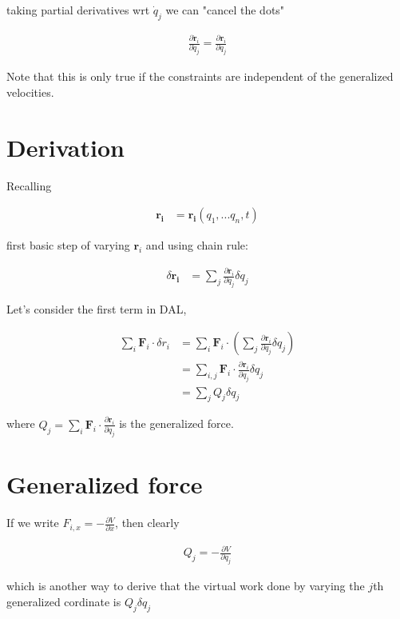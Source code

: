 \documentclass{article}
\newcommand{\mb}{\mathbf}
\begin{document}
taking partial derivatives wrt $\dot{q}_j$ we can "cancel the dots"

\begin{align}
\frac{\partial \dot{\mb{r}}_i}{\partial \dot{q}_j} = \frac{\partial \mb{r}_i}{\partial q_j}
\end{align}

Note that this is only true if the constraints are independent of the generalized velocities.

\section{Derivation}

Recalling

\begin{align}
\mb{r_i} &= \mb{r_i}(q_1,...q_n, t)
\end{align}

first basic step of varying $\mb{r}_i$ and using chain rule:

\begin{align}
\delta\mb{r_i} &= \sum_j \frac{\partial \mb{r}_i}{\partial q_j} \delta q_j
\end{align}

Let's consider the first term in DAL,

\begin{align}
\sum_i\mb{F}_i \cdot \delta{r}_i &= \sum_i\mb{F}_i \cdot(\sum_j\frac{\partial\mb{r}_i}{\partial q_j}\delta q_j) \\
&= \sum_{i,j}\mb{F}_i \cdot \frac{\partial \mb{r}_i}{\partial q_j} \delta q_j \\
&= \sum_j Q_j \delta q_j
\end{align}

where $Q_j = \sum_i \mb{F}_i \cdot \frac{\partial \mb{r}_i}{\partial q_j}$ is the generalized force.

\section{Generalized force}

If we write $F_{i,x} = -\frac{\partial V}{\partial x}$, then clearly 

\begin{align}
Q_j = -\frac{\partial V}{\partial q_j}
\end{align}

which is another way to derive that the virtual work done by varying the $j$th generalized cordinate is $Q_j \delta q_j$
\end{document}
